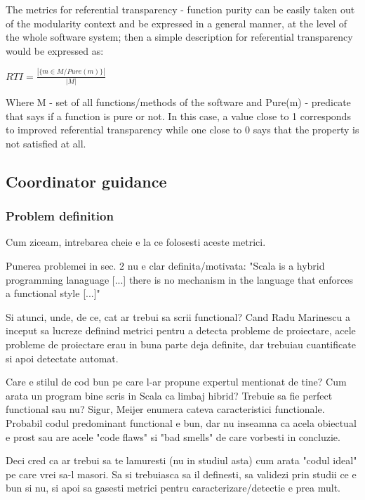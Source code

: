 \documentclass{article}
\begin{document}
The metrics for referential transparency - function purity can be easily taken out of the modularity context and be expressed in a general manner, at the level of the whole software system; then a simple description for referential transparency would be expressed as:  \par
\begin{center}
\begin{math}
  RTI = \frac{ | \{ m \in M / Pure(m) \} | } { | M | }
\end{math}
\end{center}

Where  M - set of all functions/methods of the software and  Pure(m) - predicate that says if a function is pure or not. In this case, a value close to 1 corresponds to improved referential transparency while one close to 0 says that the property is not satisfied at all. \par

\subsection {Coordinator guidance}

\subsubsection {Problem definition}
Cum ziceam, intrebarea cheie e la ce folosesti aceste metrici.

Punerea problemei in sec. 2 nu e clar definita/motivata:
"Scala is a hybrid programming lanaguage [...] there is no mechanism in
the language that enforces a functional style [...]"

Si atunci, unde, de ce, cat ar trebui sa scrii functional?
Cand Radu Marinescu a inceput sa lucreze definind metrici pentru a detecta
probleme de proiectare, acele probleme de proiectare erau in buna parte
deja definite, dar trebuiau cuantificate si apoi detectate automat.

Care e stilul de cod bun pe care l-ar propune expertul mentionat de tine?
Cum arata un program bine scris in Scala ca limbaj hibrid?
Trebuie sa fie perfect functional sau nu?
Sigur, Meijer enumera cateva caracteristici functionale. Probabil codul
predominant functional e bun, dar nu inseamna ca acela obiectual e prost
sau are acele "code flaws" si "bad smells" de care vorbesti in concluzie.

Deci cred ca ar trebui sa te lamuresti (nu in studiul asta) cum arata
"codul ideal" pe care vrei sa-l masori. Sa si trebuiasca sa il definesti,
sa validezi prin studii ce e bun si nu, si apoi sa gasesti metrici
pentru caracterizare/detectie e prea mult.
\end{document}

